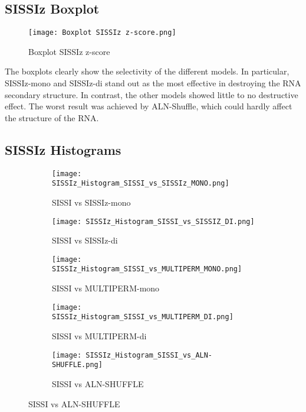 \documentclass{article}
\begin{document}
\begin{large}
\begin{large}
\begin{large}
\subsection{SISSIz Boxplot}
\begin{figure}[H]
    \centering
    \texttt{[image: Boxplot SISSIz z-score.png]}
    \caption{Boxplot SISSIz z-score}
\end{figure}

The boxplots clearly show the selectivity of the different models. In particular, SISSIz-mono and SISSIz-di stand out as the most effective in destroying the RNA secondary structure. In contrast, the other models showed little to no destructive effect. The worst result was achieved by ALN-Shuffle, which could hardly affect the structure of the RNA.

\subsection{SISSIz Histograms}

\begin{figure}[H]
    \centering
    \begin{subfigure}[b]{0.48\textwidth}
        \texttt{[image: SISSIz\_Histogram\_SISSI\_vs\_SISSIz\_MONO.png]}
        \caption{SISSI vs SISSIz-mono}
    \end{subfigure}
    \hfill
    \begin{subfigure}[b]{0.48\textwidth}
        \texttt{[image: SISSIz\_Histogram\_SISSI\_vs\_SISSIZ\_DI.png]}
        \caption{SISSI vs SISSIz-di}
    \end{subfigure}
    \vspace{1em}
    
    \begin{subfigure}[b]{0.48\textwidth}
        \texttt{[image: SISSIz\_Histogram\_SISSI\_vs\_MULTIPERM\_MONO.png]}
        \caption{SISSI vs MULTIPERM-mono}
    \end{subfigure}
    \hfill
    \begin{subfigure}[b]{0.48\textwidth}
        \texttt{[image: SISSIz\_Histogram\_SISSI\_vs\_MULTIPERM\_DI.png]}
        \caption{SISSI vs MULTIPERM-di}
    \end{subfigure}
    \vspace{1em}
    
    \begin{subfigure}[b]{0.48\textwidth}
        \texttt{[image: SISSIz\_Histogram\_SISSI\_vs\_ALN-SHUFFLE.png]}
        \caption{SISSI vs ALN-SHUFFLE}
    \end{subfigure}


\end{figure}
\end{large}
\end{large}
\end{large}
\end{document}
